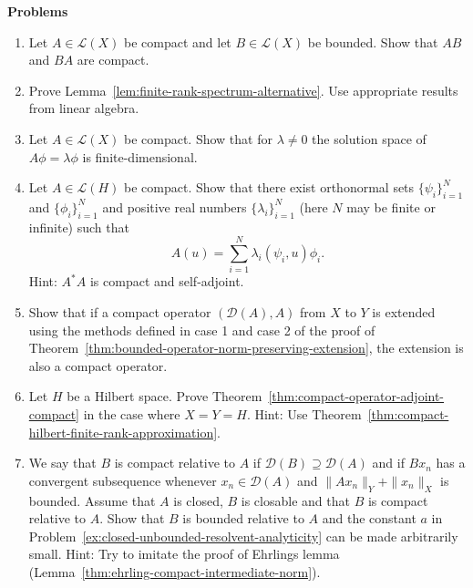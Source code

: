 \textbf{Problems}

\begin{enumerate}[label=\thesection.\arabic*.,ref=\thesection.\arabic*,start=39,series=book-problems]

\item\label{ex:bounded-compact-operator-products} Let $A\in\mathcal{L}(X)$ be compact and let $B\in\mathcal{L}(X)$ be bounded. Show that $AB$ and $BA$ are compact.

\item\label{ex:finite-rank-spectrum-alternative-proof} Prove Lemma~\ref{lem:finite-rank-spectrum-alternative}. Use appropriate results from linear algebra.

\item\label{ex:compact-nonzero-eigenspace-finite-dimensional} Let $A\in\mathcal{L}(X)$ be compact. Show that for $\lambda\ne0$ the solution space of $A\phi=\lambda\phi$ is finite-dimensional.

\item\label{ex:compact-operator-singular-system-expansion} Let $A\in\mathcal{L}(H)$ be compact. Show that there exist orthonormal sets $\{\psi_i\}_{i=1}^N$ and $\{\phi_i\}_{i=1}^N$ and positive real numbers $\{\lambda_i\}_{i=1}^N$ (here $N$ may be finite or infinite) such that
\begin{equation}\label{eq:compact-operator-singular-system-problem}
A(u)=\sum_{i=1}^N\lambda_i(\psi_i,u)\phi_i.
\end{equation}
Hint: $A^*A$ is compact and self-adjoint.

\item\label{ex:compact-operator-norm-preserving-extension} Show that if a compact operator $(\mathcal{D}(A),A)$ from $X$ to $Y$ is extended using the methods defined in case 1 and case 2 of the proof of Theorem~\ref{thm:bounded-operator-norm-preserving-extension}, the extension is also a compact operator.

\item\label{ex:compact-adjoint-hilbert-proof} Let $H$ be a Hilbert space. Prove Theorem~\ref{thm:compact-operator-adjoint-compact} in the case where $X=Y=H$. Hint: Use Theorem~\ref{thm:compact-hilbert-finite-rank-approximation}.

\item\label{ex:relative-compactness-arbitrarily-small-relative-bound} We say that $B$ is compact relative to $A$ if $\mathcal{D}(B)\supseteq\mathcal{D}(A)$ and if $Bx_n$ has a convergent subsequence whenever $x_n\in\mathcal{D}(A)$ and $\|Ax_n\|_Y+\|x_n\|_X$ is bounded. Assume that $A$ is closed, $B$ is closable and that $B$ is compact relative to $A$. Show that $B$ is bounded relative to $A$ and the constant $a$ in Problem~\ref{ex:closed-unbounded-resolvent-analyticity} can be made arbitrarily small. Hint: Try to imitate the proof of Ehrling\textquotesingle s lemma (Lemma~\ref{thm:ehrling-compact-intermediate-norm}).


\end{enumerate}

